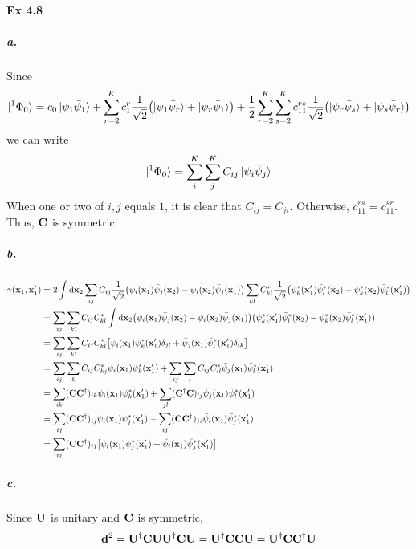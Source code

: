 \documentclass[a4paper]{article}
\newcommand{\ex}[1]{\paragraph{Ex #1}}
\newcommand{\subex}[1]{\subparagraph{#1}}
\numberwithin{equation}{subsection}
\begin{document}
\ex{4.8}
\subex{a.}
Since 
\begin{equation}\label{key}
\ket{^1\Phi_0} = c_0\ket{\psi_1\bar\psi_1} + \sum_{r=2}^K c_1^r \dfrac{1}{\sqrt{2}}\qty(\ket{\psi_1\bar\psi_r} + \ket{\psi_r\bar\psi_1}) + \dfrac{1}{2}\sum_{r=2}^K\sum_{s=2}^K c_{11}^{rs}\dfrac{1}{\sqrt{2}} \qty(\ket{\psi_r\bar\psi_s} + \ket{\psi_s\bar\psi_r})
\end{equation}
we can write
\begin{equation}\label{key}
\ket{^1\Phi_0} = \sum_i^K \sum_j^K C_{ij}\ket{\psi_i\bar\psi_j}
\end{equation}
When one or two of $ i,j $ equals $ 1 $, it is clear that $ C_{ij} = C_{ji} $. Otherwise, $ c_{11}^{rs} = c_{11}^{sr} $. \\
Thus, $ \vb{C} $ is symmetric.
\subex{b.}
\begin{align}
\gamma(\vb{x}_1,\vb{x}'_1) &= 2\int\dd\vb{x}_2 \sum_{ij} C_{ij} \dfrac{1}{\sqrt{2}} \qty(\psi_i(\vb{x}_1)\bar\psi_j(\vb{x}_2) - \psi_i(\vb{x}_2)\bar\psi_j(\vb{x}_1)) 
\sum_{kl} C^*_{kl} \dfrac{1}{\sqrt{2}} \qty(\psi_k^*(\vb{x}'_1)\bar\psi_l^*(\vb{x}_2) - \psi_k^*(\vb{x}_2)\bar\psi_l^*(\vb{x}'_1)) \notag\\
&= \sum_{ij}\sum_{kl} C_{ij} C^*_{kl} \int\dd\vb{x}_2 \qty(\psi_i(\vb{x}_1)\bar\psi_j(\vb{x}_2) - \psi_i(\vb{x}_2)\bar\psi_j(\vb{x}_1)) 
\qty(\psi_k^*(\vb{x}'_1)\bar\psi_l^*(\vb{x}_2) - \psi_k^*(\vb{x}_2)\bar\psi_l^*(\vb{x}'_1)) \notag\\
&= \sum_{ij}\sum_{kl} C_{ij} C^*_{kl} 
\qty[\psi_i(\vb{x}_1)\psi_k^*(\vb{x}'_1)\delta_{jl}
 + \bar\psi_j(\vb{x}_1)\bar\psi_l^*(\vb{x}'_1)\delta_{ik}
] \notag\\
&= \sum_{ij}\sum_k C_{ij} C^*_{kj} \psi_i(\vb{x}_1)\psi_k^*(\vb{x}'_1)
+ \sum_{ij}\sum_l C_{ij} C^*_{il} \bar\psi_j(\vb{x}_1)\bar\psi_l^*(\vb{x}'_1)
 \notag\\
&= \sum_{ik} (\vb{C}\vb{C}^\dagger)_{ik} \psi_i(\vb{x}_1)\psi_k^*(\vb{x}'_1)
+ \sum_{jl} (\vb{C}^\dagger\vb{C})_{lj} \bar\psi_j(\vb{x}_1)\bar\psi_l^*(\vb{x}'_1)
\notag\\
&= \sum_{ij} (\vb{C}\vb{C}^\dagger)_{ij} \psi_i(\vb{x}_1)\psi_j^*(\vb{x}'_1)
+ \sum_{ij} (\vb{C}\vb{C}^\dagger)_{ji} \bar\psi_i(\vb{x}_1)\bar\psi_j^*(\vb{x}'_1)
\notag\\
&= \sum_{ij} (\vb{C}\vb{C}^\dagger)_{ij} \qty[\psi_i(\vb{x}_1)\psi_j^*(\vb{x}'_1)
+ \bar\psi_i(\vb{x}_1)\bar\psi_j^*(\vb{x}'_1)]
\end{align}
\subex{c.}
Since $ \vb{U} $ is unitary and $ \vb{C} $ is symmetric,
\begin{equation}\label{key}
\vb{d}^2 = \vb{U}^\dagger\vb{C}\vb{U} \vb{U}^\dagger\vb{C}\vb{U} = \vb{U}^\dagger\vb{C}\vb{C}\vb{U} = \vb{U}^\dagger\vb{C}\vb{C}^\dagger\vb{U}
\end{equation}
\end{document}

